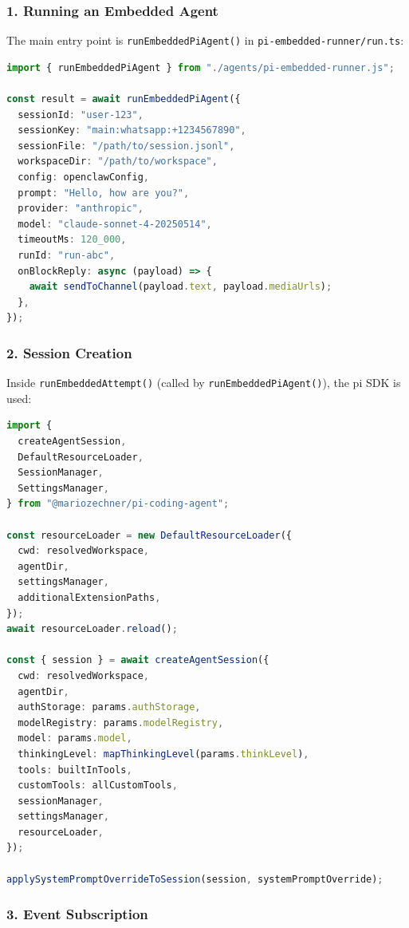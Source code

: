 \subsubsection{1. Running an Embedded Agent}


The main entry point is \texttt{runEmbeddedPiAgent()} in \texttt{pi-embedded-runner/run.ts}:

\begin{lstlisting}[language=typescript]
import { runEmbeddedPiAgent } from "./agents/pi-embedded-runner.js";

const result = await runEmbeddedPiAgent({
  sessionId: "user-123",
  sessionKey: "main:whatsapp:+1234567890",
  sessionFile: "/path/to/session.jsonl",
  workspaceDir: "/path/to/workspace",
  config: openclawConfig,
  prompt: "Hello, how are you?",
  provider: "anthropic",
  model: "claude-sonnet-4-20250514",
  timeoutMs: 120_000,
  runId: "run-abc",
  onBlockReply: async (payload) => {
    await sendToChannel(payload.text, payload.mediaUrls);
  },
});
\end{lstlisting}


\subsubsection{2. Session Creation}


Inside \texttt{runEmbeddedAttempt()} (called by \texttt{runEmbeddedPiAgent()}), the pi SDK is used:

\begin{lstlisting}[language=typescript]
import {
  createAgentSession,
  DefaultResourceLoader,
  SessionManager,
  SettingsManager,
} from "@mariozechner/pi-coding-agent";

const resourceLoader = new DefaultResourceLoader({
  cwd: resolvedWorkspace,
  agentDir,
  settingsManager,
  additionalExtensionPaths,
});
await resourceLoader.reload();

const { session } = await createAgentSession({
  cwd: resolvedWorkspace,
  agentDir,
  authStorage: params.authStorage,
  modelRegistry: params.modelRegistry,
  model: params.model,
  thinkingLevel: mapThinkingLevel(params.thinkLevel),
  tools: builtInTools,
  customTools: allCustomTools,
  sessionManager,
  settingsManager,
  resourceLoader,
});

applySystemPromptOverrideToSession(session, systemPromptOverride);
\end{lstlisting}


\subsubsection{3. Event Subscription}


